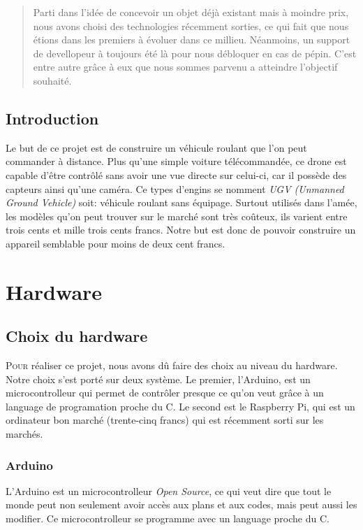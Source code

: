 \documentclass[a4paper,12pt]{report}
\begin{document}
{\clearpage
\begin{abstract}
Parti dans l'idée de concevoir un objet déjà existant mais à moindre prix, nous avons choisi des technologies récemment sorties, ce qui fait que nous étions dans les premiers à évoluer dans ce millieu. Néanmoins, un support de devellopeur à toujours été là pour nous débloquer en cas de pépin. C'est entre autre grâce à eux que nous sommes parvenu a atteindre l'objectif souhaité.
\end{abstract}
\clearpage
\tableofcontents
\clearpage
\listoffigures
\listoftables 
\clearpage



\section*{Introduction}
Le but de ce projet est de construire un véhicule roulant que l'on peut commander à distance. Plus qu'une simple voiture télécommandée, ce drone est capable d'être contrôlé sans avoir une vue directe sur celui-ci, car il possède des capteurs ainsi qu'une caméra. Ce types d'engins se nomment \textit{UGV (Unmanned Ground Vehicle)} soit: véhicule roulant sans équipage. Surtout utilisés dans l'amée, les modèles qu'on peut trouver sur le marché sont très coûteux, ils varient entre trois cents et mille trois cents francs. Notre but est donc de pouvoir construire un appareil semblable pour moins de deux cent francs. 
\clearpage


\chapter{Hardware}

\section{Choix du hardware}
\lettrine{P}{our} réaliser ce projet, nous avons dû faire des choix au niveau du hardware. Notre choix s'est porté sur deux système. Le premier, l'Arduino, est un microcontrolleur qui permet de contrôler presque ce qu'on veut grâce à un language de programation proche du C. Le second est le Raspberry Pi, qui est un ordinateur bon marché (trente-cinq francs) qui est récemment sorti sur les marchés. 


\subsection{Arduino}
L'Arduino \label{Arduino} \cite{Arduino} est un microcontrolleur \textit{Open Source}, ce qui veut dire que tout le monde peut non seulement avoir accès aux plans et aux codes, mais peut aussi les modifier. Ce microcontrolleur se programme avec un language proche du C. 


}
\end{document}
